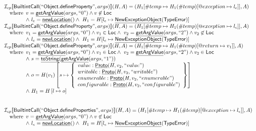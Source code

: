 \documentclass{article}
\makeatletter
\newcommand{\SF}[1]{\mbox{\textsf{#1}}}
\newcommand{\wherec}[1]{{\rm where}\begin{array}[t]{l}#1\end{array}}
\newcommand{\Loc}{\SF{Loc}}
\newcommand{\I}{\mathcal{I}}
\newcommand{\lbr}{\llbracket}
\newcommand{\rbr}{\rrbracket}
\newcommand{\hf}[1]{\underline{\sf #1}}
\newcommand{\varloc}[1]{\##1}
\newcommand{\varprop}[1]{@#1}
\makeatother
\begin{document}
\[
\begin{array}{l}
\I _{cp}\lbr \SF{BuiltintCall}(``\SF{Object.defineProperty}",args)\rbr(H,A)
 = (H_1[\varloc{temp}\mapsto H_1(\varloc{temp})[\varprop{exception}\mapsto l_{e}]], A) \\
\quad\wherec{
  v = \hf{getArgValue}(args, ``0") \land v\not\in\Loc\\
  \land\ l_e = \hf{newLocation}() \land\ H_1=H[l_e\mapsto\hf{NewExceptionObject}(\SF{TypeError})] }\\

\I _{cp}\lbr \SF{BuiltintCall}(``\SF{Object.defineProperty}",args)\rbr(H,A)
 = (H_1[\varloc{temp}\mapsto H_1(\varloc{temp})[\varprop{exception}\mapsto l_{e}]], A) \\
\quad\wherec{
  v_1 = \hf{getArgValue}(args, ``0") \land v_1 \in\Loc
  \land\ v_2 = \hf{getArgValue}(args, ``2") \land v_2 \not\in \Loc\\
  \land\ l_e = \hf{newLocation}() \land\ H_1=H[l_e\mapsto\hf{NewExceptionObject}(\SF{TypeError})] }\\

\I _{cp}\lbr \SF{BuiltintCall}(``\SF{Object.defineProperty}",args)\rbr(H,A)
 = (H_1[\#temp \mapsto H_1(\#temp)[@return \mapsto v_1]], A)\\
\quad\wherec{
  v_1 = \hf{getArgValue}(args, ``0") \land v_1 \in\Loc
  \land\ v_2 = \hf{getArgValue}(args, ``2") \land v_2 \in \Loc\\
  \land\ s = \hf{toString}(\hf{getArgValue}(args, ``1"))\\
  \land\ o = H(v_1)\left[
    s \mapsto \left\{
      \begin{array}{l}
        value: \hf{Proto}(H, v_2, ``value")\\
        writable: \hf{Proto}(H, v_2, ``writable") \\
        enumerable: \hf{Proto}(H, v_2, ``enumerable")\\
        configurable: \hf{Proto}(H, v_2, ``configurable")\\
      \end{array}
      \right\}
    \right]\\ 
  \land\ H_1=H\left[l\mapsto o\right]}\\
\\\\


\I _{cp}\lbr \SF{BuiltintCall}(``\SF{Object.defineProperties}",args)\rbr(H,A)
 = (H_1[\varloc{temp}\mapsto H_1(\varloc{temp})[\varprop{exception}\mapsto l_{e}]], A) \\
\quad\wherec{
  v = \hf{getArgValue}(args, ``0") \land v\not\in\Loc\\
  \land\ l_e = \hf{newLocation}() \land\ H_1=H[l_e\mapsto\hf{NewExceptionObject}(\SF{TypeError})] }\\


\end{array}\]
\end{document}
